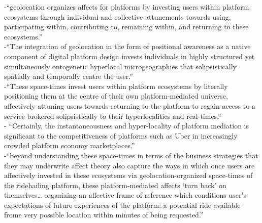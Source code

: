 -{\color{orange}“geolocation organizes affects for platforms by investing users within platform ecosystems through individual and collective attunements towards using, participating within, contributing to, remaining within, and returning to these ecosystems.”\cite{Leszczynski2019}}\\
-{\color{orange}“The integration of geolocation in the form of positional awareness as a native component of digital platform design invests individuals in highly structured yet simultaneously ontogenetic hyperlocal microgeographies that solipsistically spatially and temporally centre the user.”\cite{Leszczynski2019}}\\
-{\color{orange}“These space-times invest users within platform ecosystems by literally positioning them at the centre of their own platform-mediated universe, affectively attuning users towards returning to the platform to regain access to a service brokered solipsistically to their hyperlocalities and real-times.” \cite{Leszczynski2019}}\\
-{\color{orange} “Certainly, the instantaneousness and hyper-locality of platform mediation is significant to the competitiveness of platforms such as Uber in increasingly crowded platform economy marketplaces.”\cite{Leszczynski2019}}\\
-{\color{orange}“beyond understanding these space-times in terms of the business strategies that they may underwrite affect theory also capture the ways in which once users are affectively invested in these ecosystems via geolocation-organized space-times of the ridehailing platform, these platform-mediated affects ‘turn back’ on themselves… organizing an affective frame of reference which conditions user’s expectations of future experiences of the platform: a potential ride available frome very possible location within minutes of being requested.”\cite{Leszczynski2019}}\\
